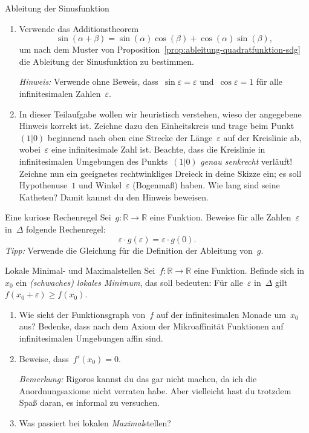 \documentclass[twoside]{../zirkelblatt}
\newcommand{\RR}{\mathbb{R}}
\theoremstyle{definition}
\theoremstyle{plain}
\theoremstyle{remark}
\begin{document}
\begin{aufgabeShaded}{Ableitung der Sinusfunktion}
\begin{enumerate}
\item Verwende das Additionstheorem
\[ \sin(\alpha+\beta) = \sin(\alpha)\cos(\beta) + \cos(\alpha)\sin(\beta), \]
um nach dem Muster von Proposition~\ref{prop:ableitung-quadratfunktion-sdg} die
Ableitung der Sinusfunktion zu bestimmen.

\emph{Hinweis:} Verwende ohne Beweis, dass~$\sin\varepsilon = \varepsilon$
und~$\cos\varepsilon = 1$ für alle infinitesimalen Zahlen~$\varepsilon$.

\item In dieser Teilaufgabe wollen wir heuristisch verstehen, wieso der
angegebene Hinweis korrekt ist. Zeichne dazu den Einheitskreis und trage beim
Punkt~$(1|0)$ beginnend nach oben eine Strecke der Länge~$\varepsilon$ auf der
Kreislinie ab, wobei~$\varepsilon$ eine infinitesimale Zahl ist. Beachte, dass
die Kreislinie in infinitesimalen Umgebungen des Punkts~$(1|0)$ \emph{genau
senkrecht} verläuft! Zeichne nun ein geeignetes rechtwinkliges Dreieck in deine
Skizze ein; es soll Hypothenuse~$1$ und Winkel~$\varepsilon$ (Bogenmaß) haben. Wie lang
sind seine Katheten? Damit kannst du den Hinweis beweisen.
\end{enumerate}
\end{aufgabeShaded}

\begin{aufgabeShaded}{Eine kuriose Rechenregel}
\label{aufg:kurios}
Sei~$g : \RR \to \RR$ eine Funktion. Beweise für alle Zahlen~$\varepsilon$
in~$\Delta$ folgende Rechenregel:
\[ \varepsilon \cdot g(\varepsilon) = \varepsilon \cdot g(0). \]
\emph{Tipp:} Verwende die Gleichung für die Definition der Ableitung von~$g$.
\end{aufgabeShaded}

\begin{aufgabeShaded}{Lokale Minimal- und Maximalstellen}
Sei~$f : \RR \to \RR$ eine Funktion. Befinde sich in~$x_0$ ein
\emph{(schwaches) lokales Minimum}, das soll bedeuten: Für alle~$\varepsilon$
in~$\Delta$ gilt~$f(x_0 + \varepsilon) \geq f(x_0)$.

\begin{enumerate}
\item Wie sieht der Funktionsgraph von~$f$ auf der infinitesimalen Monade
um~$x_0$ aus? Bedenke, dass nach dem Axiom der Mikroaffinität Funktionen auf
infinitesimalen Umgebungen affin sind.
\item Beweise, dass~$f'(x_0) = 0$.

\emph{Bemerkung:} Rigoros kannst du das gar nicht machen, da ich die
Anordnungsaxiome nicht verraten habe. Aber vielleicht hast du trotzdem Spaß
daran, es informal zu versuchen.
\item Was passiert bei lokalen \emph{Maximal}stellen?
\end{enumerate}
\end{aufgabeShaded}
\end{document}

